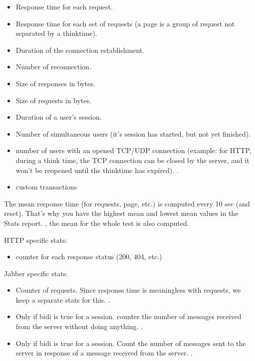 \documentclass{TSUNG-en}
\begin{document}
\begin{itemize}
\item  {} Response time for each request.
\item  {} Response time for each set of requests (a page is a group
  of request not separated by a thinktime).
\item  {} Duration of the connection establishment.
\item  {} Number of reconnection.
\item  {} Size of responses in bytes.
\item  {} Size of requests in bytes.
\item  {} Duration of a user's session.
\item  {} Number of simultaneous users (it's session has started, but not yet finished).
\item  {} number of users with an opened TCP/UDP connection (example: for
HTTP, during a think time, the TCP connection can be closed by the server,
and it won't be reopened until the thinktime has expired). .
\item  custom transactions
\end{itemize}

The mean response time (for requests, page, etc.) is computed every 10
sec (and reset). That's why you have the highest mean and lowest mean
values in the Stats report. , the mean for
the whole test is also computed.

HTTP specific stats:
\begin{itemize}
\item counter for each response status (200, 404, etc.)
\end{itemize}

Jabber specific stats:
\begin{itemize}
\item {} Counter of  requests. Since
  response time is meaningless with 
  requests, we keep a separate stats for this. .
\item {} Only if bidi is true for a
  session. counter the number of messages received from the server
  without doing anything.  .
\item {} Only if bidi is true for a
  session. Count the number of messages sent to the server in response
  of a message received from the server. .
\end{itemize}
\end{document}
